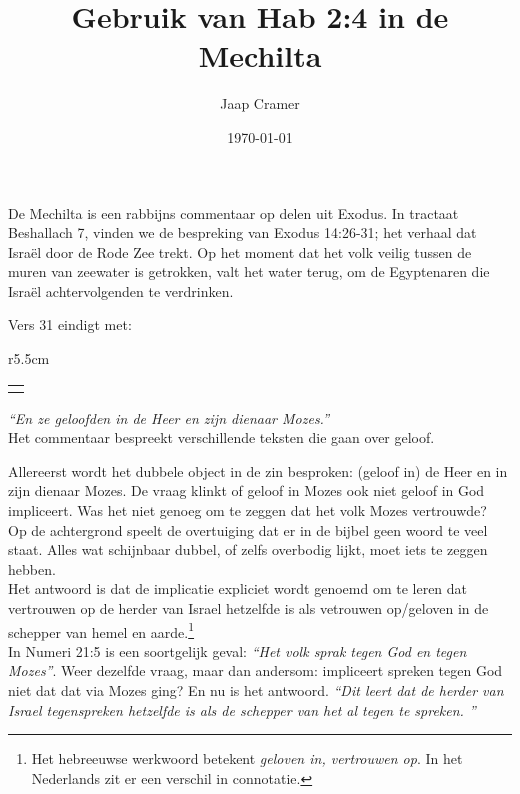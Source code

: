 \documentclass[a4paper,11pt]{article}
\title{Gebruik van Hab 2:4 in de Mechilta}
\author{Jaap Cramer}
\date{\today}
\newcommand{\h}[1]{{\heb {\beginR{#1}\endR}}}
\newcommand{\hp}[1]{\setRL {\heb{\beginR{#1}\endR}} \setLR}
\newcommand{\q}[1]{\textit{\enquote{#1}}}
\newcommand{\com}[2]{\par
\begin{wrapfigure}{r}{5.5cm}
  \vspace{-15pt}%
    \begin{tabular}{p{5.5cm}} #1 \end{tabular}%
  \vspace{-12pt}%
\end{wrapfigure}
\noindent #2\\}
\begin{document}
\maketitle

De Mechilta is een rabbijns commentaar op delen uit Exodus. In tractaat Beshallach 7, vinden we de bespreking van Exodus 14:26-31; het verhaal dat Israël door de Rode Zee trekt. Op het moment dat het volk veilig tussen de muren van zeewater is getrokken, valt het water terug, om de Egyptenaren die Israël achtervolgenden te verdrinken.

Vers 31 eindigt met:\\
\com{ \hp{וַֽיַּאֲמִ֨ינוּ֙ בַּֽיהוָ֔ה וּבְמֹשֶׁ֖ה עַבְדּֽוֹ} }
{\q{En ze geloofden in de Heer en zijn dienaar Mozes.}}

Het commentaar bespreekt verschillende teksten die gaan over geloof.


Allereerst wordt het dubbele object in de zin besproken: (geloof in) de Heer en in zijn dienaar Mozes. De vraag klinkt of geloof in Mozes ook niet geloof in  God impliceert. Was het niet genoeg om te zeggen dat het volk Mozes vertrouwde? \\ %
Op de achtergrond speelt de overtuiging dat er in de bijbel geen woord te veel staat. Alles wat schijnbaar dubbel, of zelfs overbodig lijkt, moet iets te zeggen hebben.\\
Het antwoord is dat de implicatie expliciet wordt genoemd om te leren dat vertrouwen op de herder van Israel hetzelfde is als vetrouwen op/geloven in de schepper van hemel en aarde.\footnote{Het hebreeuwse werkwoord \h{ןמא} betekent \textit{geloven in, vertrouwen op}. In het Nederlands zit er een verschil in connotatie.}\\
In Numeri 21:5 is een soortgelijk geval: \q{Het volk sprak tegen God en tegen Mozes}. Weer dezelfde vraag, maar dan andersom: impliceert spreken tegen God niet dat dat via Mozes ging? En nu is het antwoord. \q{Dit leert dat de herder van Israel tegenspreken hetzelfde is als de schepper van het al tegen te spreken. }
\end{document}

